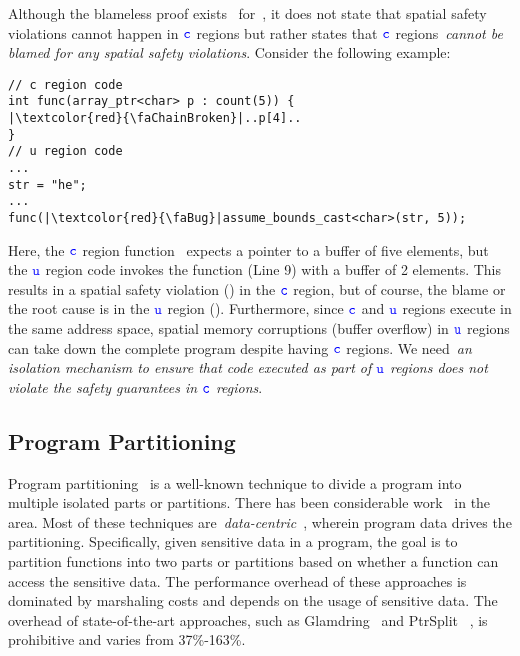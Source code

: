 Although the blameless proof exists~\cite{ruef2019achieving, li22checkedc} for~\checkedc, it does not state that spatial safety violations cannot happen in $\textcolor{blue}{\texttt{c}}$ regions but rather states that $\textcolor{blue}{\texttt{c}}$ regions~\emph{cannot be blamed for any spatial safety violations}.
Consider the following example:
\begin{verbatim}
// c region code
int func(array_ptr<char> p : count(5)) {
|\textcolor{red}{\faChainBroken}|..p[4]..
}
// u region code
...
str = "he";
...
func(|\textcolor{red}{\faBug}|assume_bounds_cast<char>(str, 5)); 
\end{verbatim}
Here, the $\textcolor{blue}{\texttt{c}}$ region function~ expects a pointer to a buffer of five elements, but the $\textcolor{blue}{\texttt{u}}$ region code
invokes the function (Line 9) with a buffer of 2 elements.
This results in a spatial safety violation (\textcolor{red}{\faChainBroken}) in the $\textcolor{blue}{\texttt{c}}$ region, but of course, the blame or the root cause is in the $\textcolor{blue}{\texttt{u}}$ region (\textcolor{red}{\faBug}).
Furthermore, since $\textcolor{blue}{\texttt{c}}$ and $\textcolor{blue}{\texttt{u}}$ regions execute in the same address space, spatial memory corruptions (\eg buffer overflow) in $\textcolor{blue}{\texttt{u}}$ regions can take down the complete program despite having $\textcolor{blue}{\texttt{c}}$ regions.
We need~\emph{an isolation mechanism to ensure that code executed as part of $\textcolor{blue}{\texttt{u}}$  regions does not violate the safety guarantees in $\textcolor{blue}{\texttt{c}}$ regions}.

\subsection{Program Partitioning}
\label{subsec:background:programpart}
Program partitioning~\cite{rul2009towards} is a well-known technique to divide a program into multiple isolated parts or partitions.
There has been considerable work~\cite{tan2017principles, brumley2004privtrans, bittau2008wedge, lind2017glamdring, liu2017ptrsplit} in the area.
Most of these techniques are~\emph{data-centric}~\cite{lind2017glamdring, liu2017ptrsplit}, wherein program data drives the partitioning.
Specifically, given sensitive data in a program, the goal is to partition functions into two parts or partitions based on whether a function can access the sensitive data.
The performance overhead of these approaches is dominated by marshaling costs and depends on the usage of sensitive data.
The overhead of state-of-the-art approaches, such as Glamdring~\cite{lind2017glamdring} and  PtrSplit~
\cite{liu2017ptrsplit}, is prohibitive and varies from 37\%-163\%.

